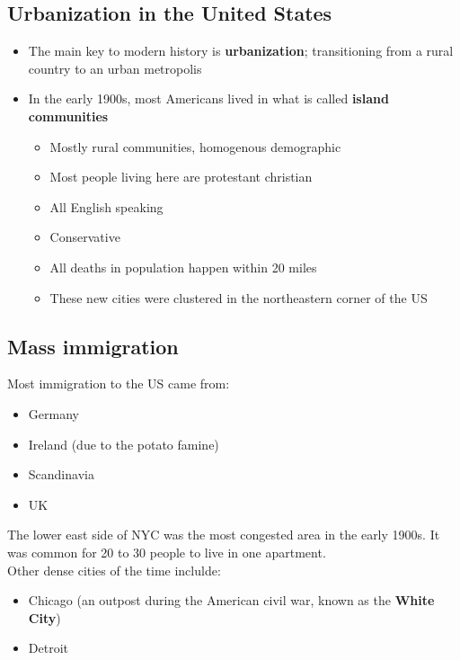 \documentclass[12pt]{book}
\begin{document}
\subsection{Urbanization in the United States}

\begin{itemize}
    \item The main key to modern history is \textbf{urbanization}; transitioning from a rural country to an urban metropolis
    \item In the early 1900s, most Americans lived in what is called \textbf{island communities}
    \begin{itemize}
        \item Mostly rural communities, homogenous demographic
        \item Most people living here are protestant christian
        \item All English speaking
        \item Conservative
        \item All deaths in population happen within 20 miles
        \item These new cities were clustered in the northeastern corner of the US
    \end{itemize} 
\end{itemize}

\subsection{Mass immigration}
Most immigration to the US came from:
\begin{itemize}
    \item Germany
    \item Ireland (due to the potato famine)
    \item Scandinavia
    \item UK
\end{itemize}

The lower east side of NYC was the most congested area in the early 1900s. It was common for 20 to 30 people to live in one apartment.\\

Other dense cities of the time inclulde:

\begin{itemize}
    \item Chicago (an outpost during the American civil war, known as the \textbf{White City})
    \item Detroit
\end{itemize}
\end{document}
